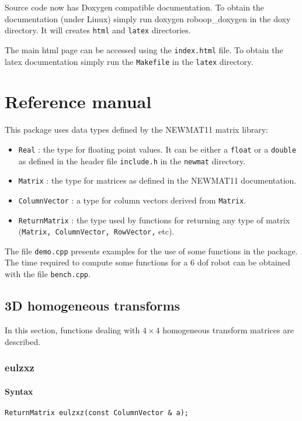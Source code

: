 \documentclass[11pt,fleqn,letterpaper]{report}
\begin{document}
Source code now has \textsf{Doxygen} compatible documentation. To
obtain the documentation (under \textsf{Linux}) simply run
\textsf{doxygen roboop\_doxygen} in the doxy directory. It will
creates \texttt{html} and \texttt{latex} directories.

The main html page can be accessed using the \texttt{index.html} file.
To obtain the latex documentation simply run the \texttt{Makefile} in
the \texttt{latex} directory.

\chapter{Reference manual}

This package uses data types defined by the \textsf{NEWMAT11} matrix
library:
\begin{itemize}
\item {\tt Real} : the type for floating point values. It can be 
either a {\tt float} or a {\tt double}  as defined in the header file 
{\tt include.h} in the {\tt newmat} directory.

\item {\tt Matrix} : the type for matrices as defined in the
    \textsf{NEWMAT11} documentation.

\item {\tt ColumnVector} : a type for column vectors derived from {\tt Matrix}.

\item {\tt ReturnMatrix} : the type used by functions for returning any type of 
matrix ({\tt Matrix, ColumnVector, RowVector,} etc). 
\end{itemize}

The file {\tt demo.cpp} presents examples for the use of some functions in the 
package. The time required to compute some functions for a 6 dof robot can be obtained
with the file {\tt bench.cpp}.
\section{3D homogeneous transforms}

In this section, functions dealing with $4 \times 4$ homogeneous transform
matrices are described.

\newpage

\subsection*{eulzxz}

\subsubsection*{Syntax}
\begin{verbatim}
ReturnMatrix eulzxz(const ColumnVector & a);
\end{verbatim}
\end{document}
